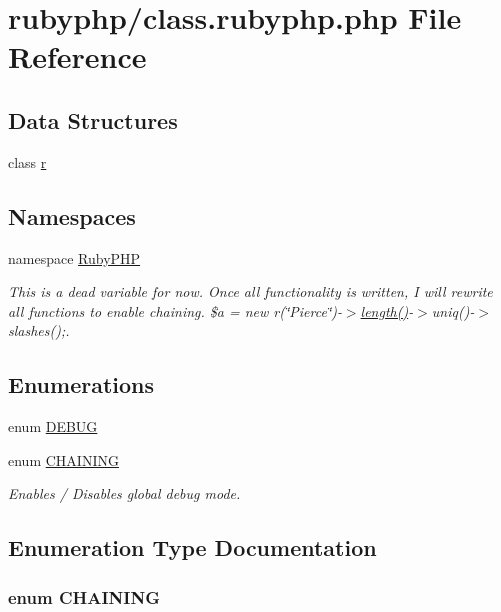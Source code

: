 \hypertarget{class_8rubyphp_8php}{\section{rubyphp/class.rubyphp.\-php File Reference}
\label{class_8rubyphp_8php}
}
\subsection*{Data Structures}
\begin{DoxyCompactItemize}
\item 
class \hyperlink{classr}{r}
\end{DoxyCompactItemize}
\subsection*{Namespaces}
\begin{DoxyCompactItemize}
\item 
namespace \hyperlink{namespace_ruby_p_h_p}{Ruby\-P\-H\-P}
\begin{DoxyCompactList}\small\item\em This is a dead variable for now. Once all functionality is written, I will rewrite all functions to enable chaining. \$a = new r(\char`\"{}\-Pierce\char`\"{})-\/$>$\hyperlink{index_8php_a328bd7d697cc1b3dfd1859d35420f2d0}{length()}-\/$>$uniq()-\/$>$slashes();. \end{DoxyCompactList}\end{DoxyCompactItemize}
\subsection*{Enumerations}
\begin{DoxyCompactItemize}
\item 
enum \hyperlink{class_8rubyphp_8php_a73585d7121de037cf2e2ca12b27eb83e}{D\-E\-B\-U\-G} 
\item 
enum \hyperlink{class_8rubyphp_8php_a2ef56c4551609dbec9cf98bd6008f646}{C\-H\-A\-I\-N\-I\-N\-G} 
\begin{DoxyCompactList}\small\item\em Enables / Disables global debug mode. \end{DoxyCompactList}\end{DoxyCompactItemize}


\subsection{Enumeration Type Documentation}
\hypertarget{class_8rubyphp_8php_a2ef56c4551609dbec9cf98bd6008f646}{
\subsubsection[{C\-H\-A\-I\-N\-I\-N\-G}]{\setlength{\rightskip}{0pt plus 5cm}enum {\bf C\-H\-A\-I\-N\-I\-N\-G}}}\label{class_8rubyphp_8php_a2ef56c4551609dbec9cf98bd6008f646}


